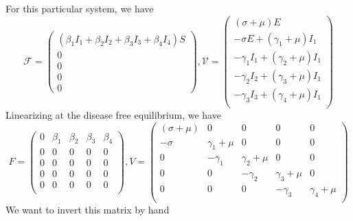 \documentclass{article}
\begin{document}
For this particular system, we have
$$
\mathcal{F} = \begin{pmatrix}
(\beta_1 I_1 + \beta_2 I_2 + \beta_3 I_3 + \beta_4 I_4) S\\
0\\
0\\
0\\
0
\end{pmatrix}, \mathcal{V} = \begin{pmatrix}
(\sigma + \mu) E \\
- \sigma E + (\gamma_1 + \mu) I_1\\
- \gamma_1 I_1 + (\gamma_2 + \mu) I_1\\
- \gamma_2 I_2 + (\gamma_3 + \mu) I_1\\
- \gamma_3 I_3 + (\gamma_4 + \mu) I_1\\
\end{pmatrix}
$$
Linearizing at the disease free equilibrium, we have
$$
F = \begin{pmatrix}
0 & \beta_1 & \beta_2 & \beta_3 & \beta_4\\
0 & 0 & 0 & 0 & 0\\
0 & 0 & 0 & 0 & 0\\
0 & 0 & 0 & 0 & 0\\
0 & 0 & 0 & 0 & 0\\
\end{pmatrix},
V = \begin{pmatrix}
(\sigma + \mu) & 0 & 0 & 0 & 0\\
- \sigma & \gamma_1 + \mu & 0 & 0 & 0\\
0 & - \gamma_1 & \gamma_2 + \mu & 0 & 0\\
0 & 0 & - \gamma_2 & \gamma_3 + \mu & 0\\
0 & 0 & 0 & - \gamma_3 & \gamma_4 + \mu\\
\end{pmatrix}
$$
We want to invert this matrix by hand
\end{document}
